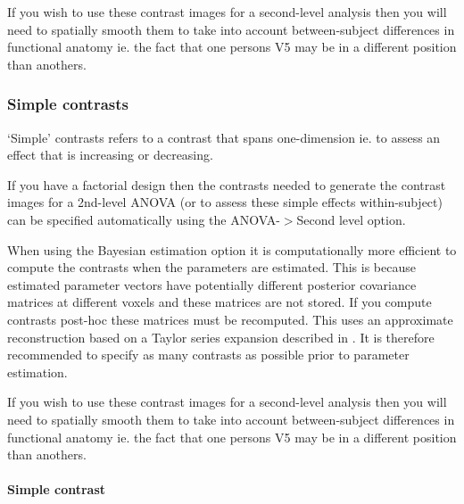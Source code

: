                                                                                                             

If you wish to use these contrast images for a second-level analysis then you will need to spatially smooth them to take into account between-subject differences in functional anatomy ie. the fact that one persons V5 may be in a different position than anothers. 


\subsubsection{Simple contrasts}
`Simple' contrasts refers to a contrast that spans one-dimension ie. to assess an effect that is increasing or decreasing.

                                                                                                            

If you have a factorial design then the contrasts needed to generate the contrast images for a 2nd-level ANOVA (or to assess these simple effects within-subject) can be specified automatically using the ANOVA-$>$Second level option.

                                                                                                            

When using the Bayesian estimation option it is computationally more efficient to compute the contrasts when the parameters are estimated. This is because estimated parameter vectors have potentially different posterior covariance matrices at different voxels and these matrices are not stored. If you compute contrasts post-hoc these matrices must be recomputed. This uses an approximate reconstruction based on a Taylor series expansion described in \cite{vb3}. It is therefore recommended to specify as many contrasts as possible prior to parameter estimation.

                                                                                                            

If you wish to use these contrast images for a second-level analysis then you will need to spatially smooth them to take into account between-subject differences in functional anatomy ie. the fact that one persons V5 may be in a different position than anothers. 


\paragraph{Simple contrast}




